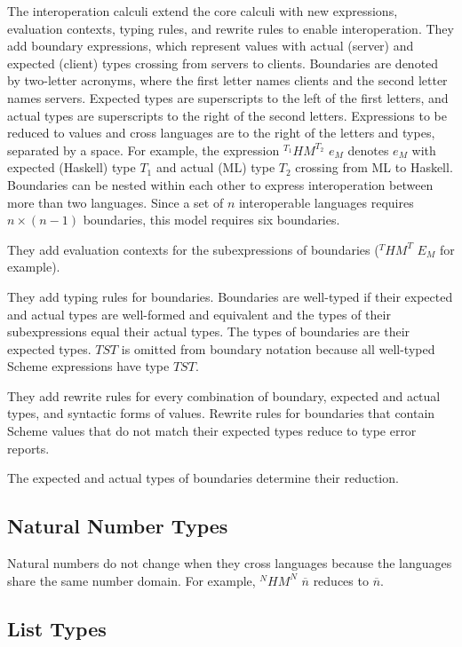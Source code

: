 The interoperation calculi extend the core calculi with new expressions, evaluation contexts, typing rules, and rewrite rules to enable interoperation.  They add boundary expressions, which represent values with actual (server) and expected (client) types crossing from servers to clients.  Boundaries are denoted by two-letter acronyms, where the first letter names clients and the second letter names servers.  Expected types are superscripts to the left of the first letters, and actual types are superscripts to the right of the second letters.  Expressions to be reduced to values and cross languages are to the right of the letters and types, separated by a space.  For example, the expression $^{T_{1}}HM^{T_{2}}$ $e_{M}$ denotes $e_{M}$ with expected (Haskell) type $T_{1}$ and actual (ML) type $T_{2}$ crossing from ML to Haskell.  Boundaries can be nested within each other to express interoperation between more than two languages.  Since a set of $n$ interoperable languages requires $n\times(n-1)$ boundaries, this model requires six boundaries.

They add evaluation contexts for the subexpressions of boundaries ($^{T}HM^{T}$ $E_{M}$ for example).

They add typing rules for boundaries.  Boundaries are well-typed if their expected and actual types are well-formed and equivalent and the types of their subexpressions equal their actual types.  The types of boundaries are their expected types.  $TST$ is omitted from boundary notation because all well-typed Scheme expressions have type $TST$.

They add rewrite rules for every combination of boundary, expected and actual types, and syntactic forms of values.  Rewrite rules for boundaries that contain Scheme values that do not match their expected types reduce to type error reports.

The expected and actual types of boundaries determine their reduction.

\subsection{Natural Number Types}

Natural numbers do not change when they cross languages because the languages share the same number domain.  For example, $^{N}HM^{N}$ $\overline{n}$ reduces to $\overline{n}$.

\subsection{List Types}

